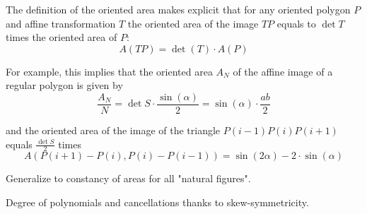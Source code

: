 The definition of the oriented area makes explicit that for any oriented polygon $P$
and affine transformation $T$ the oriented area of the image $TP$ equals to $\det T$
times the oriented area of $P$:
\begin{equation*}
A(TP) = \det(T) \cdot  A(P)
\end{equation*}

For example, this implies that the oriented area $A_N$ of the affine image of a regular polygon is given by
\begin{equation}
\frac{A_N}{N} = \det S \cdot \frac{\sin(α)}2 = \sin(α) \cdot \frac{ab}{2}
\end{equation}

and the oriented area of the image of the triangle $P(i-1) P(i) P(i+1)$ equals $\frac{\det S}2$ times
\begin{equation}
A(P(i+1)-P(i),P(i)-P(i-1))  =  \sin(2α) - 2 \cdot \sin(α)
\end{equation}

{\color{blue} Generalize to constancy of areas for all "natural figures".}

{\color{red} Degree of polynomials and cancellations thanks to skew-symmetricity.}


